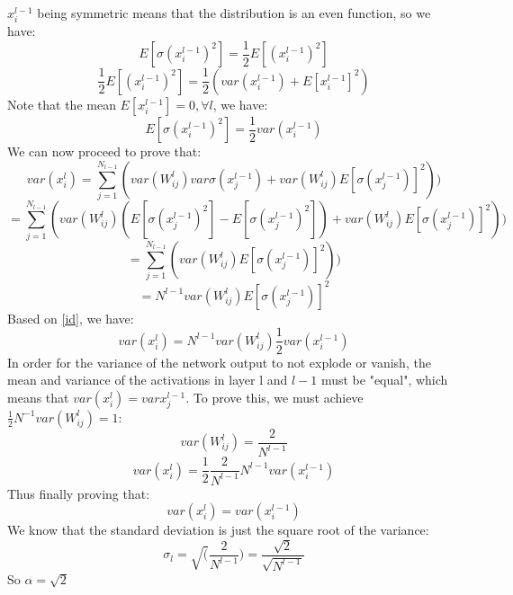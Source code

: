 $x_i^{l-1}$ being symmetric means that the distribution is an even function, so we have:
\begin{equation*}
	E[\sigma(x_i^{l-1})^2] = \frac{1}{2}E[(x_i^{l-1})^2] 
\end{equation*}
\begin{equation*}
	\frac{1}{2}E[(x_i^{l-1})^2] = \frac{1}{2}(var(x_i^{l-1}) + E[x_i^{l-1}]^2)
\end{equation*}
Note that the mean $E[x_i^{l-1}] = 0, \forall l$, we have:
\begin{equation}\label{id}
	E[\sigma(x_i^{l-1})^2] = \frac{1}{2}var(x_i^{l-1}) 
\end{equation}
We can now proceed to prove that:
\begin{equation*}
	var(x_i^l) = \sum_{j=1}^{N_{l-1}}(var(W_{ij}^l)var\sigma(x_j^{l-1}) + var(W_{ij}^l)E[\sigma(x_j^{l-1})]^2))
\end{equation*}
\begin{equation*}
	= \sum_{j=1}^{N_{l-1}}(var(W_{ij}^l)(E[\sigma(x_j^{l-1})^2] - E[\sigma(x_j^{l-1})^2])+ var(W_{ij}^l)E[\sigma(x_j^{l-1})]^2))
\end{equation*}
\begin{equation*}
	= \sum_{j=1}^{N_{l-1}}(var(W_{ij}^l)E[\sigma(x_j^{l-1})]^2))
\end{equation*}
\begin{equation*}
	= N^{l-1}var(W_{ij}^l)E[\sigma(x_j^{l-1})]^2
\end{equation*}
Based on \ref{id}, we have:
\begin{equation*}
	var(x_i^l) = N^{l-1}var(W_{ij}^l)\frac{1}{2}var(x_i^{l-1})
\end{equation*}
In order for the variance of the network output to not explode or vanish, the mean and variance of the activations in layer l  and $l-1$ must be "equal", which means that $var(x_i^l) = var{x_j^{l-1}}$. To prove this, we must achieve $\frac{1}{2}N^{-1}var(W_{ij}^{l}) = 1$:
\begin{equation*}
	var(W_{ij}^l) = \frac{2}{N^{l-1} }
\end{equation*}
\begin{equation*}
	var(x_i^l) = \frac{1}{2}\frac{2}{N^{l-1}}N^{l-1}var(x_i^{l-1})
\end{equation*}
Thus finally proving that:
\begin{equation*}
	var(x_i^l) = var(x_i^{l-1})
\end{equation*}
We know that the standard deviation is just the square root of the variance:
\begin{equation*}
	\sigma_l = \sqrt(\frac{2}{N^{l-1}}) = \frac{\sqrt2}{\sqrt{N^{l-1}}}
\end{equation*}
So $\alpha = \sqrt2$